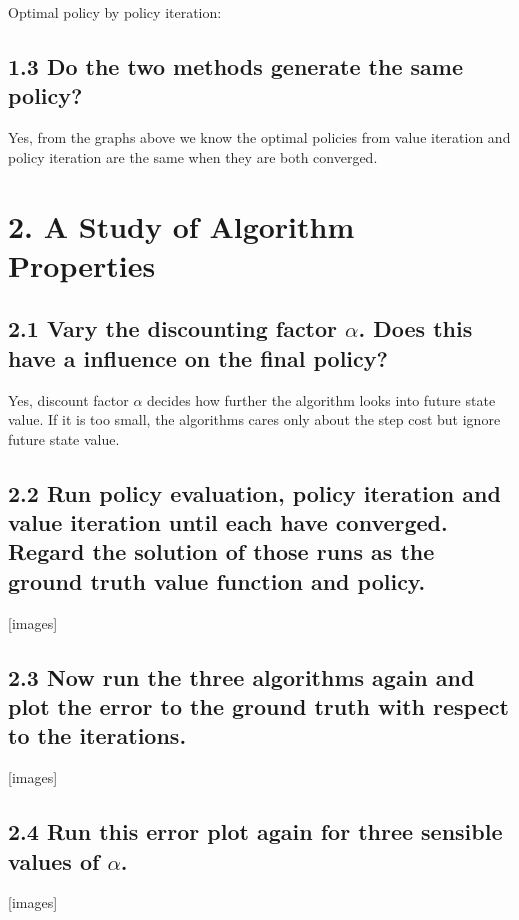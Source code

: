 \documentclass[12pt,a4paper,titlepage]{article}
\begin{document}
Optimal policy by policy iteration:\\

\subsection*{1.3 Do the two methods generate the same policy?}
Yes, from the graphs above we know the optimal policies from value iteration and policy iteration are the same when they are both converged.

\section*{2. A Study of Algorithm Properties}
\subsection*{2.1 Vary the discounting factor $\alpha$. Does this have a influence on the final policy?}
Yes, discount factor $\alpha$ decides how further the algorithm looks into future state value. If it is too small, the algorithms cares only about the step cost but ignore future state value.
\subsection*{2.2 Run policy evaluation, policy iteration and value iteration until each have converged. Regard the solution of those runs as the ground truth value function and policy.}
[images]
\subsection*{2.3 Now run the three algorithms again and plot the error to the ground truth with respect to the iterations.}
[images]
\subsection*{2.4 Run this error plot again for three sensible values of $\alpha$.}
[images]
\end{document}
